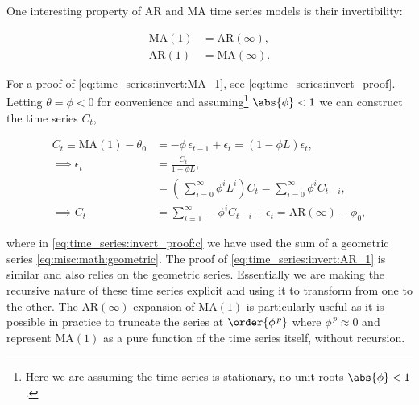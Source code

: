 One interesting property of AR and MA time series models is their invertibility:

\begin{subequations}\label{eq:time_series:invert}
\begin{align}
\text{MA}\left(1\right) &= \text{AR}\left(\infty\right), \label{eq:time_series:invert:MA_1} \\
\text{AR}\left(1\right) &= \text{MA}\left(\infty\right). \label{eq:time_series:invert:AR_1}
\end{align}
\end{subequations}

For a proof of \cref{eq:time_series:invert:MA_1}, see \cref{eq:time_series:invert_proof}.
Letting $\theta = \phi < 0$ for convenience and
assuming\footnote{Here we are assuming the time series is stationary, \ie no unit roots $\abs{\phi} < 1$.} $\abs{\phi} < 1$
we can construct the time series $C_{t}$,

\begin{subequations}\label{eq:time_series:invert_proof}
\begin{align}
C_{t} \equiv \text{MA}\left(1\right) - \theta_{0} &= -\phi\, \epsilon_{t-1} + \epsilon_{t} = \left(1 - \phi L \right) \epsilon_{t}, \label{eq:time_series:invert_proof:a} \\
\implies \epsilon_{t} &= \frac{C_{t}}{1 - \phi L}, \label{eq:time_series:invert_proof:b} \\
&= \left(\,\sum_{i=0}^{\infty} \phi^{i} L^{i} \right) C_{t} = \sum_{i=0}^{\infty} \phi^{i} C_{t-i}, \label{eq:time_series:invert_proof:c} \\
\implies C_{t} &= \sum_{i=1}^{\infty} -\phi^{i} C_{t-i} + \epsilon_{t} = \text{AR}\left(\infty\right) - \phi_{0}, \label{eq:time_series:invert_proof:d}
\end{align}
\end{subequations}

\noindent where in \cref{eq:time_series:invert_proof:c} we have used
the sum of a geometric series \cref{eq:misc:math:geometric}.
The proof of \cref{eq:time_series:invert:AR_1} is similar and also relies on the geometric series.
Essentially we are making the recursive nature of these time series explicit and using it to transform from one to the other.
The $\text{AR}\left(\infty\right)$ expansion of $\text{MA}\left(1\right)$
is particularly useful as it is possible in practice to truncate the series at $\order{\phi^{\,p}}$
where $\phi^{\,p} \approx 0$ and represent $\text{MA}\left(1\right)$ as
a pure function of the time series itself, \ie without recursion.

